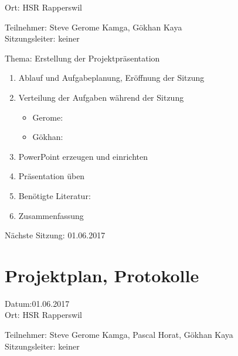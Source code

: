 Ort: HSR Rapperswil

Teilnehmer: Steve Gerome Kamga, Gökhan Kaya\\

Sitzungsleiter: keiner

Thema: Erstellung der Projektpräsentation
\begin{enumerate}

\item Ablauf und Aufgabeplanung, Eröffnung der Sitzung 

\item  Verteilung der Aufgaben während der Sitzung
\begin{itemize}
\item Gerome: 
\item Gökhan: 
\end{itemize}

\item PowerPoint erzeugen und einrichten

\item Präsentation üben


\item Benötigte Literatur: 

\item Zusammenfassung

\end{enumerate}

Nächste Sitzung: 01.06.2017



\newpage
\section*{Projektplan, Protokolle}

Datum:01.06.2017\\
Ort: HSR Rapperswil

Teilnehmer: Steve Gerome Kamga, Pascal Horat, Gökhan Kaya\\
Sitzungsleiter: keiner

